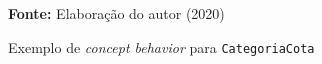 \begin{figure}[ht!]
\centering

\caption{\textmd{Exemplo de \textit{concept behavior} para \texttt{CategoriaCota}}}
\label{fig:behaviorcat}

\par\medskip\textbf{Fonte:} Elaboração do autor (2020) \par\medskip

\end{figure}

